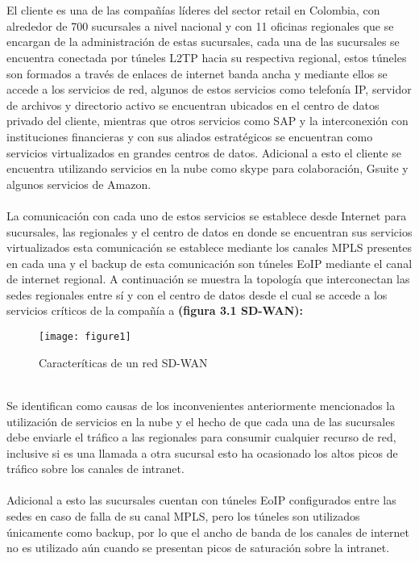 \\
\\
El cliente es una de las compañías líderes del sector retail en Colombia, con alrededor de 700 sucursales a nivel nacional y con 11 oficinas regionales que se encargan de la administración de estas sucursales, cada una de las sucursales se encuentra  conectada por túneles L2TP hacia su respectiva regional, estos túneles son formados a través de enlaces de internet banda ancha y mediante ellos se accede a los servicios de red, algunos de estos servicios como telefonía IP, servidor de archivos y directorio activo se encuentran ubicados en el centro de datos privado del cliente, mientras que otros servicios como SAP y la interconexión con instituciones financieras y con sus aliados estratégicos se encuentran como servicios virtualizados en grandes centros de datos. Adicional a esto el cliente se encuentra utilizando servicios en la nube como skype para colaboración, Gsuite y algunos servicios de Amazon.
\\
\\
La comunicación con cada uno de estos servicios se establece desde Internet para sucursales, las regionales y el centro de datos en donde se encuentran sus servicios virtualizados esta comunicación se establece mediante los canales MPLS presentes en cada una y el backup de esta comunicación son túneles EoIP mediante el canal de internet regional. A continuación se muestra la topología que interconectan las sedes regionales entre sí y con el centro de datos desde el cual se accede a los servicios críticos de la compañía a \textbf{(figura 3.1 SD-WAN):}
\begin{figure}[htbp]
  \centering
    {\texttt{[image: figure1]}}%
  \caption{Caracteríticas de un red SD-WAN}
  \label{fig:fig2subfig}
\end{figure}
\\
Se identifican como causas de los inconvenientes anteriormente mencionados la utilización de servicios en la nube y el hecho de que cada una de las sucursales debe enviarle el tráfico a las regionales para consumir cualquier recurso de red, inclusive si es una llamada a otra sucursal esto ha ocasionado los altos picos de tráfico sobre los canales de intranet.
\\
\\
Adicional a esto las sucursales cuentan con túneles EoIP configurados entre las sedes en caso de falla de su canal MPLS, pero los túneles son utilizados únicamente como backup, por lo que el ancho de banda de los canales de internet no es utilizado aún cuando se presentan picos de saturación sobre la intranet.
